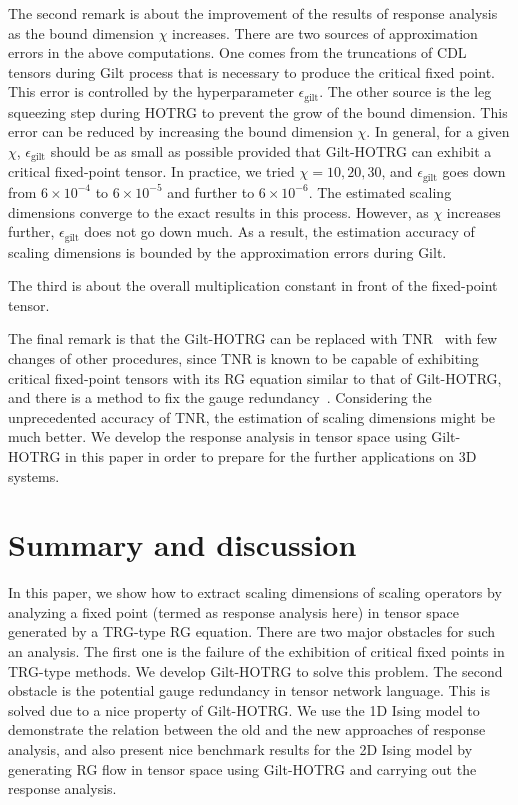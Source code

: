 \documentclass[aps,prb,reprint,superscriptaddress]{revtex4-2}
\begin{document}
The second remark is about the improvement of the results of response
analysis as the bound dimension $\chi$ increases. There are two sources
of approximation errors in the above computations. One comes from the
truncations of CDL tensors during Gilt process that is necessary to
produce the critical fixed point. This error is controlled by the
hyperparameter $\epsilon_{\text{gilt}}$. The other source is the leg
squeezing step during HOTRG to prevent the grow of the bound dimension.
This error can be reduced by increasing the bound dimension $\chi$. In
general, for a given $\chi$, $\epsilon_{\text{gilt}}$ should be as small
as possible provided that Gilt-HOTRG can exhibit a critical fixed-point
tensor. In practice, we tried $\chi = 10, 20, 30$, and
$\epsilon_{\text{gilt}}$ goes down from $6\times 10^{-4}$ to
$6\times10^{-5}$ and further to $6\times10^{-6}$.  The estimated scaling
dimensions converge to the exact results in this process. However, as
$\chi$ increases further, $\epsilon_{\text{gilt}}$ does not go down
much. As a result, the estimation accuracy of scaling dimensions is
bounded by the approximation errors during Gilt. 
%

The third is about the overall multiplication constant in front of the
fixed-point tensor.
%

The final remark is that the Gilt-HOTRG can be replaced with
TNR~\cite{tnr,tnralgo} with few changes of other procedures, since TNR
is known to be capable of exhibiting critical fixed-point tensors with
its RG equation similar to that of Gilt-HOTRG, and there is a method to
fix the gauge redundancy~\cite{tnralgo}. Considering the unprecedented
accuracy of TNR, the estimation of scaling dimensions might be much
better. We develop the response analysis in tensor space using
Gilt-HOTRG in this paper in order to prepare for the further
applications on 3D systems.
%


\section{Summary and discussion}
In this paper, we show how to extract scaling dimensions of scaling
operators by analyzing a fixed point (termed as response analysis
here) in tensor space generated by a TRG-type RG equation. There are two
major obstacles for such an analysis. The first one is the failure of
the exhibition of critical fixed points in TRG-type methods. We develop
Gilt-HOTRG to solve this problem. The second obstacle is the potential
gauge redundancy in tensor network language. This is solved due to a
nice property of Gilt-HOTRG.  We use the 1D Ising model to demonstrate
the relation between the old and the new approaches of response
analysis, and also present nice benchmark results for the 2D Ising model
by generating RG flow in tensor space using Gilt-HOTRG and carrying out
the response analysis. 
%
\end{document}
